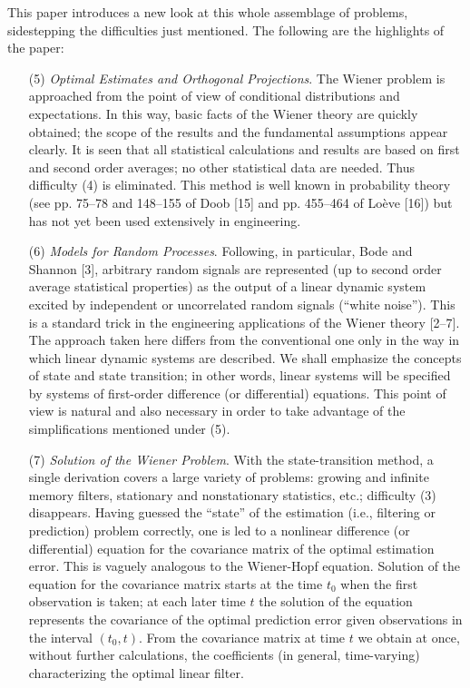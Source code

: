 \documentclass{article}
\begin{document}
This paper introduces a new look at this whole assemblage of problems, sidestepping the difficulties just mentioned. The following are the highlights of the paper:
\begin{itemize}
\item[(5)] \emph{Optimal Estimates and Orthogonal Projections}. The Wiener problem is approached from the point of view of conditional distributions and expectations. In this way, basic facts of the Wiener theory are quickly obtained; the scope of the results and the fundamental assumptions appear clearly. It is seen that all statistical calculations and results are based on first and second order averages; no other statistical data are needed. Thus difficulty (4) is eliminated. This method is well known in probability theory (see pp. 75--78 and 148--155 of Doob [15] and pp. 455--464 of Lo\`eve [16]) but has not yet been used extensively in engineering.
\item[(6)] \emph{Models for Random Processes}. Following, in particular, Bode and Shannon [3], arbitrary random signals are represented (up to second order average statistical properties) as the output of a linear dynamic system excited by independent or uncorrelated random signals (“white noise”). This is a standard trick in the engineering applications of the Wiener theory [2--7]. The approach taken here differs from the conventional one only in the way in which linear dynamic systems are described. We shall emphasize the concepts of state and state transition; in other words, linear systems will be specified by systems of first-order difference (or differential) equations. This point of view is natural and also necessary in order to take advantage of the simplifications mentioned under (5).
\item[(7)] \emph{Solution of the Wiener Problem}. With the state-transition method, a single derivation covers a large variety of problems: growing and infinite memory filters, stationary and nonstationary statistics, etc.; difficulty (3) disappears. Having guessed the “state” of the estimation (i.e., filtering or prediction) problem correctly, one is led to a nonlinear difference (or differential) equation for the covariance matrix of the optimal estimation error. This is vaguely analogous to the Wiener-Hopf equation. Solution of the equation for the covariance matrix starts at the time $t_0$ when the first observation is taken; at each later time $t$ the solution of the equation represents the covariance of the optimal prediction error given observations in the interval $(t_0, t)$. From the covariance matrix at time $t$ we obtain at once, without further calculations, the coefficients (in general, time-varying) characterizing the optimal linear filter.

\end{itemize}
\end{document}
